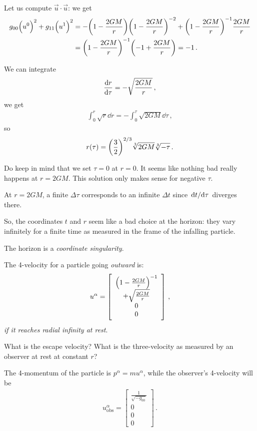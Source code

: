\documentclass[main.tex]{subfiles}
\begin{document}
Let us compute \(\vec{u} \cdot \vec{u}\): we get 
%
\begin{align}
  g_{00} \qty(u^{0})^2 + g_{11} \qty(u^{1})^2
  &= - \qty(1 - \frac{2GM}{r})\qty(1 - \frac{2GM}{r})^{-2}
  + \qty(1 - \frac{2GM}{r})^{-1} \frac{2GM}{r}  \\
  &= \qty(1 - \frac{2GM}{r})^{-1} \qty(-1 + \frac{2GM}{r})= -1 
\,.
\end{align}
%

We can integrate 
%
\begin{align}
  \dv{r}{\tau } = - \sqrt{\frac{2GM}{r}}
\,,
\end{align}
%
we get 
%
\begin{align}
  \int _{0}^{r} \sqrt{r} \dd{r} =- \int _{0}^{\tau } \sqrt{2GM} \dd{\tau }   
\,,
\end{align}
%
so 
%
\begin{align}
  r(\tau ) = \qty(\frac{3}{2})^{2/3} \sqrt[3]{2GM} \sqrt[3]{- \tau } 
\,.
\end{align}

Do keep in mind that we set \(\tau =0\) at \(r=0\). 
It seems like nothing bad really happens at \(r=2GM\). 
This solution only makes sense for negative \(\tau \). 

At \(r = 2GM\), a finite \(\Delta \tau \) corresponds to an infinite \(\Delta t\) since \(\dv*{t}{\tau }\) diverges  there. 

So, the coordinates \(t\) and \(r\) seem like a bad choice at the horizon: they vary infinitely for a finite time as measured in the frame of the infalling particle. 

The horizon is a \emph{coordinate singularity}. 

The 4-velocity for a particle going \emph{outward} is: 
%
\begin{align}
  u^{\alpha } = \left[\begin{array}{c}
    \qty(1 - \frac{2GM}{r})^{-1} \\ 
  + \sqrt{\frac{2GM}{r}} \\ 
  0 \\ 
  0
  \end{array}\right]
\,,
\end{align}
%
\emph{if it reaches radial infinity at rest}. 

What is the escape velocity? What is  the three-velocity as measured by an observer at rest at constant \(r\)?

The 4-momentum of the particle is \(p^{\alpha } = m u^{\alpha }\), while the observer's 4-velocity will be 
%
\begin{align}
  u _{\text{obs}}^{\alpha } = \left[\begin{array}{c}
  \frac{1}{\sqrt{-g_{00} }} \\ 
  0 \\ 
  0 \\ 
  0
  \end{array}\right]
\,.
\end{align}
\end{document}
